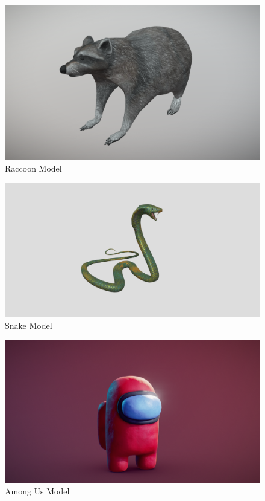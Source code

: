 \documentclass{article}
\begin{document}
    \begin{figure}
        \centering
        \includegraphics[width=\textwidth]{images/models/raccoon.png}
        \caption{Raccoon Model \cite{model-raccoon}} \label{fig:raccoon-model}
    \end{figure}
    \begin{figure}
        \centering
        \includegraphics[width=\textwidth]{images/models/snake.png}
        \caption{Snake Model \cite{model-snake}} \label{fig:snake-model}
    \end{figure}
    \begin{figure}
        \centering
        \includegraphics[width=\textwidth]{images/models/among_us.png}
        \caption{Among Us Model \cite{model-among-us}} \label{fig:among-us-model}
    \end{figure}
\end{document}

